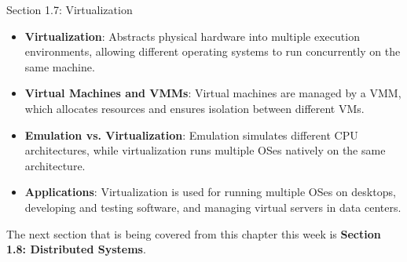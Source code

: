 \begin{notes}{Section 1.7: Virtualization}
\begin{highlight}
    \end{highlight}
    
    \begin{highlight}
    
    \begin{itemize}
        \item \textbf{Virtualization}: Abstracts physical hardware into multiple execution environments, allowing different operating systems to run concurrently on the same machine.
        \item \textbf{Virtual Machines and VMMs}: Virtual machines are managed by a VMM, which allocates resources and ensures isolation between different VMs.
        \item \textbf{Emulation vs. Virtualization}: Emulation simulates different CPU architectures, while virtualization runs multiple OSes natively on the same architecture.
        \item \textbf{Applications}: Virtualization is used for running multiple OSes on desktops, developing and testing software, and managing virtual servers in data centers.
    \end{itemize}
    
    \end{highlight}
\end{notes}

The next section that is being covered from this chapter this week is \textbf{Section 1.8: Distributed Systems}.

